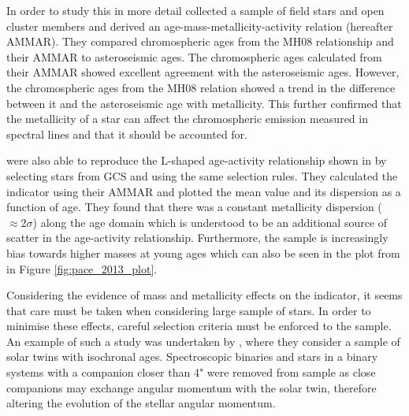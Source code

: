 In order to study this in more detail \citet{Lorenzo_Oliveira_etal_2016} collected a sample of field stars and open cluster members and derived an age-mass-metallicity-activity relation (hereafter AMMAR). They compared chromospheric ages from the MH08 relationship and their AMMAR to asteroseismic ages. The chromospheric ages calculated from their AMMAR showed excellent agreement with the asteroseismic ages. However, the chromospheric ages from the MH08 relation showed a trend in the difference between it and the asteroseismic age with metallicity. This further confirmed that the metallicity of a star can affect the chromospheric emission measured in \caII spectral lines and that it should be accounted for.

\citet{Lorenzo_Oliveira_etal_2016} were also able to reproduce the L-shaped age-activity relationship shown in \citet{Pace_2013} by selecting stars from GCS and using the same selection rules. They calculated the \Rprime indicator using their AMMAR and plotted the mean value and its dispersion as a function of age. They found that there was a constant metallicity dispersion ($\approx 2\sigma$) along the age domain which is understood to be an additional source of scatter in the age-activity relationship. Furthermore, the sample is increasingly bias towards higher masses at young ages which can also be seen in the plot from \citet{Pace_2013} in Figure \ref{fig:pace_2013_plot}.

Considering the evidence of mass and metallicity effects on the \Rprime indicator, it seems that care must be taken when considering large sample of stars. In order to minimise these effects, careful selection criteria must be enforced to the sample. An example of such a study was undertaken by \citet{Lorenzo_Oliveira_etal_2018}, where they consider a sample of solar twins with isochronal ages. Spectroscopic binaries and stars in a binary systems with a companion closer than 4" were removed from sample as close companions may exchange angular momentum with the solar twin, therefore altering the evolution of the stellar angular momentum.

